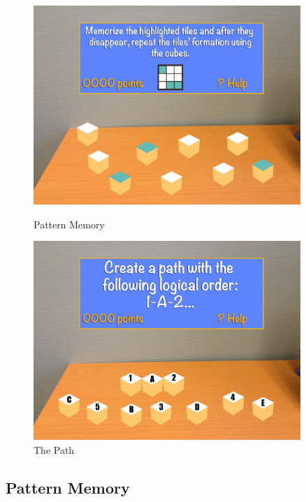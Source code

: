 \begin{figure}[h]
	\centering
	\begin{minipage}{.5\textwidth}
		\capstart
		\centering
		\includegraphics[width=0.9\textwidth]{images/Costas/game_mockup3(matrix).jpg}
		\vspace{-10pt}
		\caption{Pattern Memory}
		\label{fig:Costas_pattern_memory}
	\end{minipage}%
	\begin{minipage}{.5\textwidth}
		\capstart
		\centering
		\includegraphics[width=0.9\textwidth]{images/Costas/game_mockup5(path).jpg}
		\vspace{-10pt}
		\caption{The Path}
		\label{fig:Costas_the_path}
	\end{minipage}%
\end{figure}


\subsection{Pattern Memory}
	\label{game:pattern_memory}

